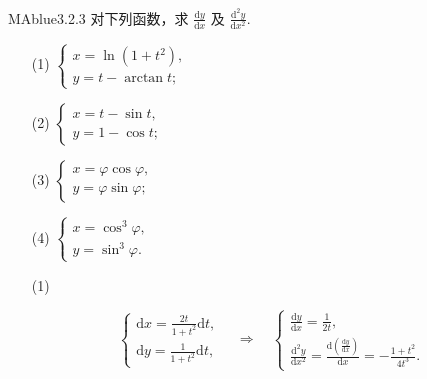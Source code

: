 \begin{problem}{MAblue}{3.2.3}
    对下列函数，求 $\frac{\mathrm dy}{\mathrm dx}$ 及 $\frac{\mathrm d^2y}{\mathrm dx^2}$.
    \begin{multicols}{2}
        \begin{enumerate}
            \item[(1)]
            $\begin{cases}
                x = \ln(1+t^2), \\
                y = t - \arctan t;
            \end{cases}$
            \item[(2)]
            $\begin{cases}
                x = t - \sin t, \\
                y = 1 - \cos t;
            \end{cases}$
            \item[(3)]
            $\begin{cases}
                x = \varphi \cos \varphi, \\
                y = \varphi \sin \varphi;
            \end{cases}$
            \item[(4)]
            $\begin{cases}
                x = \cos^3 \varphi, \\
                y = \sin^3 \varphi.
            \end{cases}$
        \end{enumerate}
    \end{multicols}
\end{problem}

\begin{enumerate}
    \item[(1)]
    \begin{solution}
    \[
        \begin{cases}
            \mathrm dx = \frac{2t}{1+t^2} \mathrm dt, \\
            \mathrm dy = \frac 1 {1+t^2} \mathrm dt,
        \end{cases}
        \quad \Rightarrow \quad
        \begin{cases}
            \frac{\mathrm dy}{\mathrm dx} = \frac 1 {2t}, \\
            \frac{\mathrm d^2y}{\mathrm dx^2} = \frac{\mathrm d \left( \frac{\mathrm dy}{\mathrm dx} \right)}{\mathrm dx} = -\frac{1+t^2}{4t^3}.
        \end{cases}
    \]
    \end{solution}
\end{enumerate}

